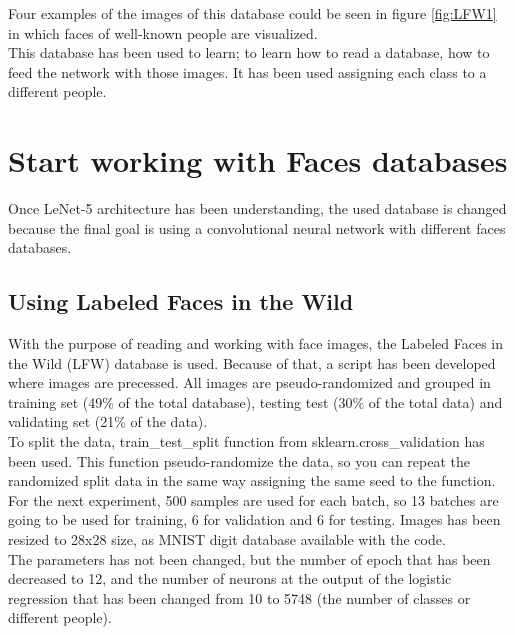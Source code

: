 Four examples of the images of this database could be seen in figure \ref{fig:LFW1} in which faces of well-known people are visualized.\\


This database has been used to learn; to learn how to read a database, how to feed the network with those images. It has been used assigning each class to a different people.\\

\section{Start working with Faces databases}
Once LeNet-5 architecture has been understanding, the used database is changed because the final goal is using a convolutional neural network with different faces databases.\\

\subsection{Using Labeled Faces in the Wild}
With the purpose of reading and working with face images, the Labeled Faces in the Wild (LFW) database is used. Because of that, a script has been developed where images are precessed. All images are pseudo-randomized and grouped in training set (49\% of the total database), testing test (30\% of the total data) and validating set (21\% of the data).\\

To split the data, train\_test\_split function from sklearn.cross\_validation has been used. This function pseudo-randomize the data, so you can repeat the randomized split data in the same way assigning the same seed to the function.\\

For the next experiment, 500 samples are used for each batch, so 13 batches are going to be used for training, 6 for validation and 6 for testing. Images has been resized to 28x28 size, as MNIST digit database available with the code. \\

The parameters has not been changed, but the number of epoch that has been decreased to 12, and the number of neurons at the output of the logistic regression that has been changed from 10 to 5748 (the number of classes or different people).\\

